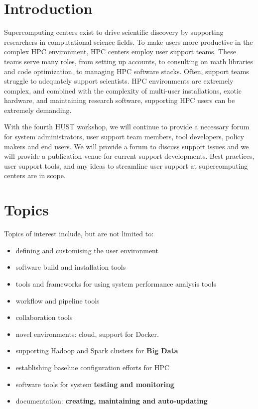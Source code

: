 \documentclass[11pt,a4paper]{article}
\begin{document}
\parindent 0pt
\parskip 6pt
\pagebreak
\section{Introduction}

Supercomputing centers exist to drive scientific discovery by supporting researchers in 
computational science fields.  To make users more productive in the complex HPC
environment, HPC centers employ user support teams.  These teams
serve many roles, from setting up accounts, to consulting on math libraries and code
optimization, to managing HPC software stacks.
Often, support teams struggle to adequately support scientists.
HPC environments are extremely complex, and combined with
the complexity of multi-user installations, exotic hardware, and maintaining
research software, supporting HPC users can be extremely demanding.

With the fourth HUST workshop, we will continue to provide a necessary forum for 
system administrators, user support team members, tool developers, policy makers and
end users.  We will provide a forum to discuss support issues and we will
provide a publication venue for current support developments.  Best practices,
user support tools, and any ideas to streamline user support at supercomputing
centers are in scope.

\section{Topics}

Topics of interest include, but are not limited to:

\begin{itemize}
\item defining and customising the user environment
\item software build and installation tools
\item tools and frameworks for using system performance analysis tools
\item workflow and pipeline tools
\item collaboration tools
\item novel environments: cloud, support for Docker.
\item supporting Hadoop and Spark clusters for {\bf Big Data}
\item establishing baseline configuration efforts for HPC
\item software tools for system {\bf testing and monitoring}
\item documentation: {\bf creating, maintaining and auto-updating}
\end{itemize}
\end{document}
